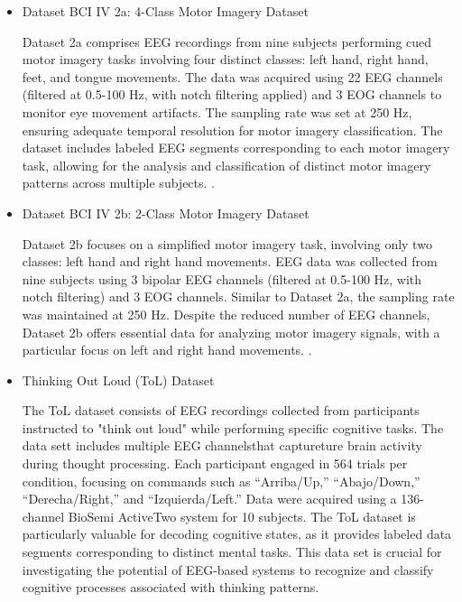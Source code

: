 \documentclass[pdflatex,sn-mathphys-num]{sn-jnl}%
\theoremstyle{thmstyleone}%
\theoremstyle{thmstyletwo}%
\theoremstyle{thmstylethree}%
\begin{document}
\begin{itemize}

\item {Dataset BCI IV 2a: 4-Class Motor Imagery Dataset}

Dataset 2a comprises EEG recordings from nine subjects performing cued motor imagery tasks involving four distinct classes: left hand, right hand, feet, and tongue movements. The data was acquired using 22 EEG channels (filtered at 0.5-100 Hz, with notch filtering applied) and 3 EOG channels to monitor eye movement artifacts. The sampling rate was set at 250 Hz, ensuring adequate temporal resolution for motor imagery classification. The dataset includes labeled EEG segments corresponding to each motor imagery task, allowing for the analysis and classification of distinct motor imagery patterns across multiple subjects. \cite{tangermann2012review}.

\item{Dataset BCI IV 2b: 2-Class Motor Imagery Dataset}

Dataset 2b focuses on a simplified motor imagery task, involving only two classes: left hand and right hand movements. EEG data was collected from nine subjects using 3 bipolar EEG channels (filtered at 0.5-100 Hz, with notch filtering) and 3 EOG channels. Similar to Dataset 2a, the sampling rate was maintained at 250 Hz. Despite the reduced number of EEG channels, Dataset 2b offers essential data for analyzing motor imagery signals, with a particular focus on left and right hand movements. \cite{leeb2008graz2b}.

\item{Thinking Out Loud (ToL) Dataset}

The ToL dataset consists of EEG recordings collected from participants instructed to "think out loud" while performing specific cognitive tasks. The data sett includes multiple EEG channelsthat captureture brain activity during thought processing. Each participant engaged in 564 trials per condition, focusing on commands such as ``Arriba/Up,'' ``Abajo/Down,'' ``Derecha/Right,'' and ``Izquierda/Left.'' Data were acquired using a 136-channel BioSemi ActiveTwo system for 10 subjects. The ToL dataset is particularly valuable for decoding cognitive states, as it provides labeled data segments corresponding to distinct mental tasks. This data set is crucial for investigating the potential of EEG-based systems to recognize and classify cognitive processes associated with thinking patterns.\cite{nieto2022thinking}

\end{itemize}
\end{document}
